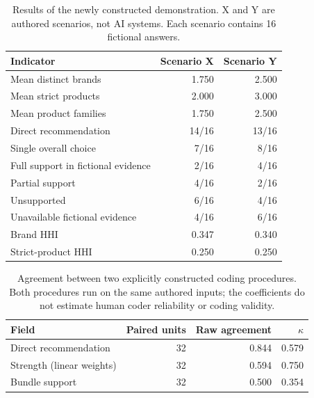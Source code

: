 \begin{table}[H]
\begin{revision}
\caption{Results of the newly constructed demonstration. X and Y are authored scenarios, not AI systems. Each scenario contains 16 fictional answers.}\label{tab:demo_profile}
\small
\begin{tabularx}{\textwidth}{Xrr}
\toprule
Indicator & Scenario X & Scenario Y \\
\midrule
Mean distinct brands & 1.750 & 2.500 \\
Mean strict products & 2.000 & 3.000 \\
Mean product families & 1.750 & 2.500 \\
Direct recommendation & 14/16 & 13/16 \\
Single overall choice & 7/16 & 8/16 \\
Full support in fictional evidence & 2/16 & 4/16 \\
Partial support & 4/16 & 2/16 \\
Unsupported & 6/16 & 4/16 \\
Unavailable fictional evidence & 4/16 & 6/16 \\
Brand HHI & 0.347 & 0.340 \\
Strict-product HHI & 0.250 & 0.250 \\
\bottomrule
\end{tabularx}
\end{revision}
\end{table}
\begin{table}[H]
\begin{revision}
\caption{Agreement between two explicitly constructed coding procedures. Both procedures run on the same authored inputs; the coefficients do not estimate human coder reliability or coding validity.}\label{tab:demo_algorithm_agreement}
\small
\begin{tabularx}{\textwidth}{Xrrr}
\toprule
Field & Paired units & Raw agreement & $\kappa$ \\
\midrule
Direct recommendation & 32 & 0.844 & 0.579 \\
Strength (linear weights) & 32 & 0.594 & 0.750 \\
Bundle support & 32 & 0.500 & 0.354 \\
\bottomrule
\end{tabularx}
\end{revision}
\end{table}
